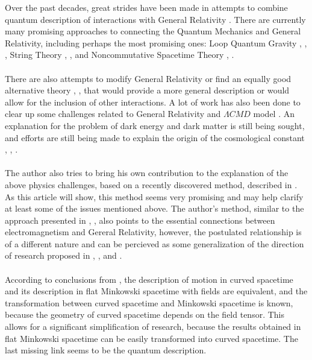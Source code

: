 \documentclass[aps,prx,preprint,groupedaddress,showkeys]{revtex4-2}
\begin{document}
Over the past decades, great strides have been made in attempts to combine quantum description of interactions with General Relativity \cite{INT1}. There are currently many promising approaches to connecting the Quantum Mechanics and General Relativity, including perhaps the most promising ones: Loop Quantum Gravity \cite{LQG1}, \cite{LQG2}, \cite{LQG3}, String Theory \cite{ST1}, \cite{ST2}, \cite{ST3} and Noncommutative Spacetime Theory \cite{NS1}, \cite{NS2}. \\
~\\
There are also attempts to modify General Relativity or find an equally good alternative theory \cite{ALT1}, \cite{ALT2}, \cite{ALT3} that would provide a more general description or would allow for the inclusion of other interactions. A lot of work has also been done to clear up some challenges related to General Relativity and $\Lambda CMD$ model \cite{LCMD}. An explanation for the problem of dark energy \cite{DE1} and dark matter \cite{DM1} is still being sought, and efforts are still being made to explain the origin of the cosmological constant  \cite{CC1}, \cite{CC2}, \cite{CC3}. \\
~\\
The author also tries to bring his own contribution to the explanation of the above physics challenges, based on a recently discovered method, described in \cite{PMofC}. As this article will show, this method seems very promising and may help clarify at least some of the issues mentioned above. The author's method, similar to the approach presented in \cite{DFF}, \cite{LLM}, \cite{GEM1} also points to the essential connections between electromagnetism and Gereral Relativity, however, the postulated relationship is of a different nature and can be percieved as some generalization of the direction of research proposed in \cite{BCIJ}, \cite{VGRA}, \cite{PGRA} and \cite{AGRA}.\\
~\\
According to conclusions from \cite{PMofC}, the description of motion in curved spacetime and its description in flat Minkowski spacetime with fields are equivalent, and the transformation between curved spacetime and Minkowski spacetime is known, because the geometry of curved spacetime depends on the field tensor. This allows for a significant simplification of research, because the results obtained in flat Minkowski spacetime can be easily transformed into curved spacetime. The last missing link seems to be the quantum description.\\
~\\
\end{document}
